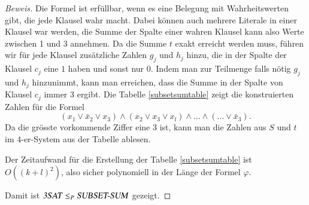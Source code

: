\begin{proof}[Beweis]
Die Formel ist erfüllbar, wenn es eine Belegung mit Wahrheitswerten
gibt, die jede Klausel wahr macht. Dabei können auch mehrere Literale
in einer Klausel war werden, die Summe der Spalte einer wahren Klausel kann
also Werte zwischen 1 und 3 annehmen. Da die Summe $t$ exakt erreicht
werden muss, führen wir für jede Klausel zusätzliche Zahlen $g_j$ und
$h_j$ hinzu, die in der Spalte der Klausel $c_j$ eine $1$ haben und sonst
nur $0$. Indem man zur Teilmenge falls nötig $g_j$ und $h_j$ hinzunimmt,
kann man erreichen, dass die Summe in der Spalte von Klausel $c_j$ immer
$3$ ergibt.
Die Tabelle \ref{subsetsumtable} zeigt die konstruierten Zahlen
für die Formel
\[
(x_1\vee \bar x_2\vee x_3)\wedge(x_2\vee x_3\vee x_l)\wedge \dots\wedge
(\dots\vee \bar x_3).
\]
Da die grösste vorkommende Ziffer eine $3$ ist, kann man die
Zahlen aus $S$  und $t$ im $4$-er-System aus der Tabelle ablesen.

Der Zeitaufwand für die Erstellung der Tabelle \ref{subsetsumtable}
ist $O((k+l)^2)$, also sicher polynomiell in der Länge der
Formel $\varphi$.

Damit ist 
$\text{\textsl{3SAT}}\le_P\text{\textsl{SUBSET-SUM}}$ gezeigt.
\end{proof}

